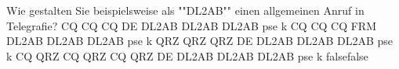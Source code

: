     {Wie gestalten Sie beispielsweise als ""DL2AB"" einen allgemeinen Anruf in Telegrafie?}
    {CQ CQ CQ DE DL2AB DL2AB DL2AB pse k}
    {CQ CQ CQ FRM DL2AB DL2AB DL2AB pse k}
    {QRZ QRZ QRZ DE DL2AB DL2AB DL2AB pse k}
    {CQ QRZ CQ QRZ CQ QRZ DE DL2AB DL2AB DL2AB pse k}
    {false}{false}